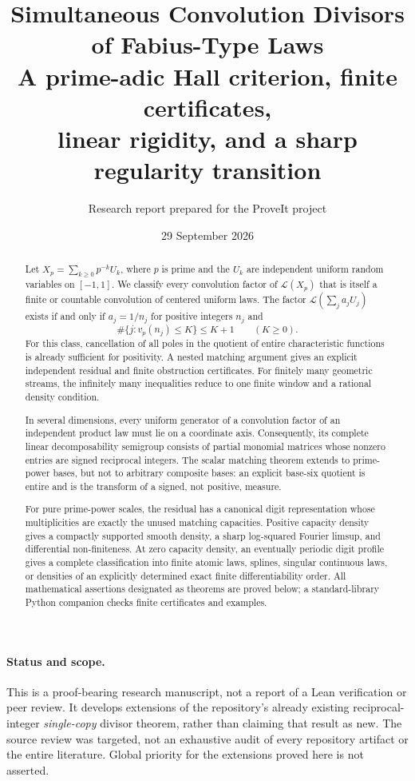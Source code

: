 \documentclass[11pt,a4paper]{article}
\title{\bfseries Simultaneous Convolution Divisors\\of Fabius-Type Laws\\[0.5em]
\large A prime-adic Hall criterion, finite certificates,\\linear rigidity, and a sharp regularity transition}
\author{Research report prepared for the ProveIt project}
\date{29 September 2026}
\theoremstyle{remark}
\newcommand{\Law}{\mathcal L}
\begin{document}
\maketitle
\begin{abstract}
Let $X_p=\sum_{k\ge0}p^{-k}U_k$, where $p$ is prime and the $U_k$ are independent
uniform random variables on $[-1,1]$. We classify every convolution factor of
$\Law(X_p)$ that is itself a finite or countable convolution of centered uniform
laws. The factor $\Law(\sum_j a_jU_j)$ exists if and only if $a_j=1/n_j$ for positive
integers $n_j$ and
\[
 \#\{j:v_p(n_j)\le K\}\le K+1\qquad(K\ge0).
\]
For this class, cancellation of all poles in the quotient of entire characteristic
functions is already sufficient for positivity. A nested matching argument gives
an explicit independent residual and finite obstruction certificates. For finitely
many geometric streams, the infinitely many inequalities reduce to one finite
window and a rational density condition.

In several dimensions, every uniform generator of a convolution factor of an
independent product law must lie on a coordinate axis. Consequently, its complete
linear decomposability semigroup consists of partial monomial matrices whose
nonzero entries are signed reciprocal integers. The scalar matching theorem
extends to prime-power bases, but not to arbitrary composite bases: an explicit
base-six quotient is entire and is the transform of a signed, not positive, measure.

For pure prime-power scales, the residual has a canonical digit representation
whose multiplicities are exactly the unused matching capacities. Positive capacity
density gives a compactly supported smooth density, a sharp log-squared Fourier
limsup, and differential non-finiteness. At zero capacity density, an eventually
periodic digit profile gives a complete classification into finite atomic laws,
splines, singular continuous laws, or densities of an explicitly determined exact
finite differentiability order. All mathematical assertions designated as theorems
are proved below; a standard-library Python companion checks finite certificates
and examples.
\end{abstract}

\paragraph{Status and scope.}
This is a proof-bearing research manuscript, not a report of a Lean verification or
peer review. It develops extensions of the repository's already existing
reciprocal-integer \emph{single-copy} divisor theorem, rather than claiming that
result as new. The source review was targeted, not an exhaustive audit of every
repository artifact or the entire literature. Global priority for the extensions
proved here is not asserted.
\end{document}
